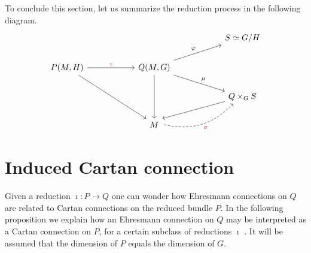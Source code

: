 \documentclass[11pt]{article}
\begin{document}
To conclude this section, let us summarize the reduction process 
in the following diagram.
\begin{displaymath}
\begin{tikzcd}[column sep=2cm]
	{}			&	& S \simeq G/H									\\
	P(M,H)	\arrow{r}[color=red]{\imath}
				\arrow[end anchor=north west]{ddr}
				&  Q(M,G)
					\arrow[start anchor=north east]{ur}{\varphi}
					\arrow[start anchor=south east]{dr}{\mu}
					\arrow{dd}										\\
				&	& Q \times_G S
						\arrow[end anchor=north east]{dl}	\\
				& M \arrow[dashed,bend right,
						start anchor={[xshift=+2pt]real east},
						end anchor={[xshift=+10pt]south west}
						]{ur}[swap,color=red]{\sigma}
\end{tikzcd}
\end{displaymath}

\section{Induced Cartan connection}

Given a reduction $\imath : P \to Q$ one can wonder how Ehresmann 
connections on $Q$ are related to Cartan connections on the 
reduced bundle $P$. In the following proposition we explain how 
an Ehresmann connection on $Q$ may be interpreted as a Cartan 
connection on $P$, for a certain subclass of reductions $\imath$ 
\cite{sharpe1997diff_geo}. It will be assumed that the dimension 
of $P$ equals the dimension of $G$.
\end{document}
